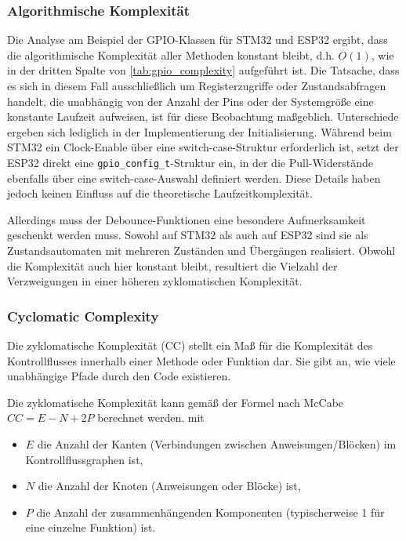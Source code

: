 \subsubsection{Algorithmische Komplexität}
Die Analyse am Beispiel der GPIO-Klassen für STM32 und ESP32 ergibt, dass die algorithmische Komplexität aller Methoden konstant bleibt, d.h. $O(1)$, wie in der dritten Spalte von \cref{tab:gpio_complexity} aufgeführt ist.
Die Tatsache, dass es sich in diesem Fall ausschließlich um Registerzugriffe oder Zustandsabfragen handelt, die unabhängig von der Anzahl der Pins oder der Systemgröße eine konstante Laufzeit aufweisen, ist für diese Beobachtung maßgeblich. 
Unterschiede ergeben sich lediglich in der Implementierung der Initialisierung.
Während beim STM32 ein Clock-Enable über eine switch-case-Struktur erforderlich ist, setzt der ESP32 direkt eine \texttt{gpio\_config\_t}-Struktur ein, in der die Pull-Widerstände ebenfalls über eine switch-case-Auswahl definiert werden. 
Diese Details haben jedoch keinen Einfluss auf die theoretische Laufzeitkomplexität.

Allerdings muss der Debounce-Funktionen eine besondere Aufmerksamkeit geschenkt werden muss. 
Sowohl auf STM32 als auch auf ESP32 sind sie als Zustandsautomaten mit mehreren Zuständen und Übergängen realisiert.
Obwohl die Komplexität auch hier konstant bleibt, resultiert die Vielzahl der Verzweigungen in einer höheren zyklomatischen Komplexität.

\subsubsection{Cyclomatic Complexity}
Die zyklomatische Komplexität (CC) stellt ein Maß für die Komplexität des Kontrollflusses innerhalb einer Methode oder Funktion dar. Sie gibt an, wie viele unabhängige Pfade durch den Code existieren. 

Die zyklomatische Komplexität kann gemäß der Formel nach McCabe\cite{McCabeMetrik} $CC= E - N + 2P$ berechnet werden.
mit 
\begin{itemize}
	\item $E$ die Anzahl der Kanten (Verbindungen zwischen Anweisungen/Blöcken) im Kontrollflussgraphen ist,
	\item $N$ die Anzahl der Knoten (Anweisungen oder Blöcke) ist,
	\item $P$ die Anzahl der zusammenhängenden Komponenten (typischerweise 1 für eine einzelne Funktion) ist.
\end{itemize}

